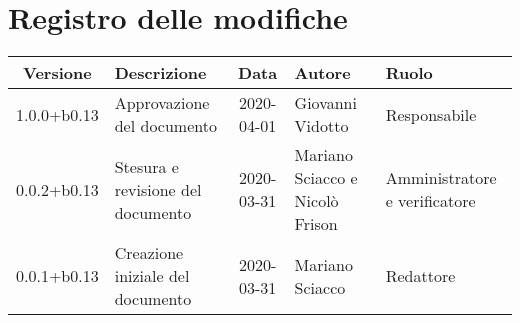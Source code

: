 \section*{Registro delle modifiche}

\begin{center}
	\begin{longtable}{|c|p{3.5cm}|c|p{3cm}|p{3cm}|}
	\hline
	\rowcolor{lighter-grayer}
	\textbf{Versione} & \textbf{Descrizione} & \textbf{Data} & \textbf{Autore} & \textbf{Ruolo} \\
	\hline
	\endfirsthead

	1.0.0+b0.13 & Approvazione del documento & 2020-04-01 & Giovanni Vidotto & Responsabile \\
	\hline
	0.0.2+b0.13 & Stesura e revisione del documento & 2020-03-31 & Mariano Sciacco e Nicolò Frison & Amministratore e verificatore \\
	\hline
	0.0.1+b0.13 & Creazione iniziale del documento & 2020-03-31 & Mariano Sciacco & Redattore \\
	\hline

	\end{longtable}
\end{center}

